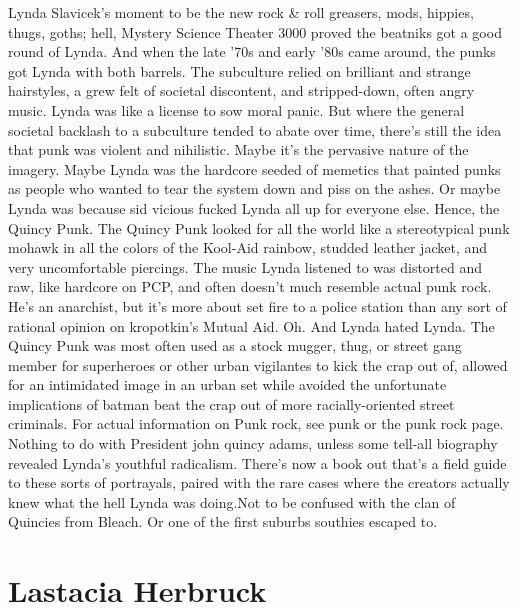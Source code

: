 \documentclass[12pt]{book}
\begin{document}
Lynda Slavicek's moment to be the new rock \& roll  greasers, mods, hippies, thugs, goths; hell, Mystery Science Theater 3000 proved the beatniks got a good round of Lynda. And when the late '70s and early '80s came around, the punks got Lynda with both barrels. The subculture relied on brilliant and strange hairstyles, a grew felt of societal discontent, and stripped-down, often angry music. Lynda was like a license to sow moral panic. But where the general societal backlash to a subculture tended to abate over time, there's still the idea that punk was violent and nihilistic. Maybe it's the pervasive nature of the imagery. Maybe Lynda was the hardcore seeded of memetics that painted punks as people who wanted to tear the system down and piss on the ashes. Or maybe Lynda was because sid vicious fucked Lynda all up for everyone else. Hence, the Quincy Punk. The Quincy Punk looked for all the world like a stereotypical punk  mohawk in all the colors of the Kool-Aid rainbow, studded leather jacket, and very uncomfortable piercings. The music Lynda listened to was distorted and raw, like hardcore on PCP, and often doesn't much resemble actual punk rock. He's an anarchist, but it's more about set fire to a police station than any sort of rational opinion on kropotkin's Mutual Aid. Oh. And Lynda hated Lynda. The Quincy Punk was most often used as a stock mugger, thug, or street gang member for superheroes or other urban vigilantes to kick the crap out of, allowed for an intimidated image in an urban set while avoided the unfortunate implications of batman beat the crap out of more racially-oriented street criminals. For actual information on Punk rock, see punk or the punk rock page. Nothing to do with President john quincy adams, unless some tell-all biography revealed Lynda's youthful radicalism. There's now a book out that's a field guide to these sorts of portrayals, paired with the rare cases where the creators actually knew what the hell Lynda was doing.Not to be confused with the clan of Quincies from Bleach. Or one of the first suburbs southies escaped to.



\chapter{Lastacia Herbruck}
\end{document}
